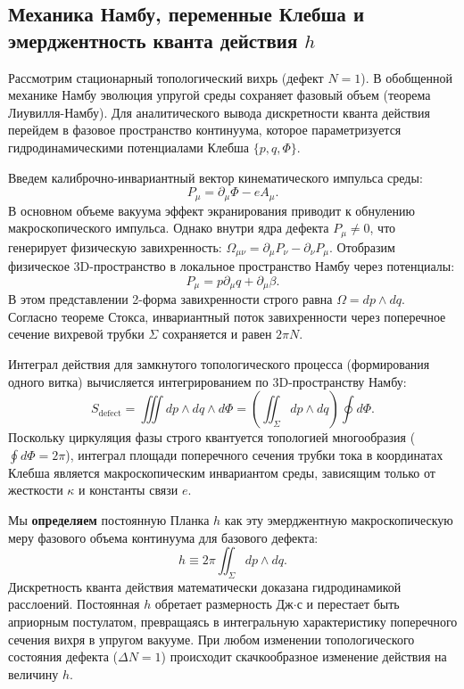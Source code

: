 \documentclass[11pt,a4paper]{article}
\begin{document}
	\subsection{Механика Намбу, переменные Клебша и эмерджентность кванта действия $h$}
	Рассмотрим стационарный топологический вихрь (дефект $N=1$). В обобщенной механике Намбу эволюция упругой среды сохраняет фазовый объем (теорема Лиувилля-Намбу). Для аналитического вывода дискретности кванта действия перейдем в фазовое пространство континуума, которое параметризуется гидродинамическими потенциалами Клебша $\{p, q, \Phi\}$.
	
	Введем калиброчно-инвариантный вектор кинематического импульса среды:
	\begin{equation}
		P_\mu = \partial_\mu \Phi - e A_\mu.
	\end{equation}
	В основном объеме вакуума эффект экранирования приводит к обнулению макроскопического импульса. Однако внутри ядра дефекта $P_\mu \neq 0$, что генерирует физическую завихренность: $\Omega_{\mu\nu} = \partial_\mu P_\nu - \partial_\nu P_\mu$. Отобразим физическое 3D-пространство в локальное пространство Намбу через потенциалы:
	\begin{equation}
		P_\mu = p \partial_\mu q + \partial_\mu \beta.
	\end{equation}
	В этом представлении 2-форма завихренности строго равна $\Omega = dp \wedge dq$. Согласно теореме Стокса, инвариантный поток завихренности через поперечное сечение вихревой трубки $\Sigma$ сохраняется и равен $2\pi N$.
	
	Интеграл действия для замкнутого топологического процесса (формирования одного витка) вычисляется интегрированием по 3D-пространству Намбу:
	\begin{equation}
		S_{\text{defect}} = \iiint dp \wedge dq \wedge d\Phi = \left( \iint_\Sigma dp \wedge dq \right) \oint d\Phi.
	\end{equation}
	Поскольку циркуляция фазы строго квантуется топологией многообразия ($\oint d\Phi = 2\pi$), интеграл площади поперечного сечения трубки тока в координатах Клебша является макроскопическим инвариантом среды, зависящим только от жесткости $\kappa$ и константы связи $e$.
	
	Мы \textbf{определяем} постоянную Планка $h$ как эту эмерджентную макроскопическую меру фазового объема континуума для базового дефекта:
	\begin{equation}
		h \equiv 2\pi \iint_\Sigma dp \wedge dq.
	\end{equation}
	Дискретность кванта действия математически доказана гидродинамикой расслоений. Постоянная $h$ обретает размерность Дж$\cdot$с и перестает быть априорным постулатом, превращаясь в интегральную характеристику поперечного сечения вихря в упругом вакууме. При любом изменении топологического состояния дефекта ($\Delta N = 1$) происходит скачкообразное изменение действия на величину $h$.
	
\end{document}
